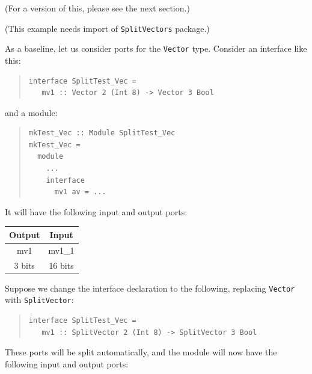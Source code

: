 \label{sec:splitports_examples_BH_vectors}

\hspace*{1em}

{\footnotesize (For a {\BSVb} version of this, please see the next section.)}

{\footnotesize (This example needs import of {\tt SplitVectors} package.)}

As a baseline, let us consider ports for the {\tt Vector} type.
Consider an interface like this:

\begin{quote}
\begin{verbatim}
interface SplitTest_Vec =
   mv1 :: Vector 2 (Int 8) -> Vector 3 Bool
\end{verbatim}
\end{quote}

and a module:

\begin{quote}
\begin{verbatim}
mkTest_Vec :: Module SplitTest_Vec
mkTest_Vec =
  module
    ...
    interface
      mv1 av = ... 
\end{verbatim}
\end{quote}

It will have the following input and output ports:

\begin{center}
  \begin{tabular}{|c||c|}
    \hline
     Output &
     Input  \\
    \hline
     mv1     &
     mv1\_1   \\
     3  bits &
     16 bits \\
    \hline
  \end{tabular}
\end{center}

Suppose we change the interface declaration to the following,
replacing {\tt Vector} with {\tt SplitVector}:

\begin{quote}
\begin{verbatim}
interface SplitTest_Vec =
   mv1 :: SplitVector 2 (Int 8) -> SplitVector 3 Bool
\end{verbatim}
\end{quote}

These ports will be split automatically, and the module will now have
the following input and output ports:

